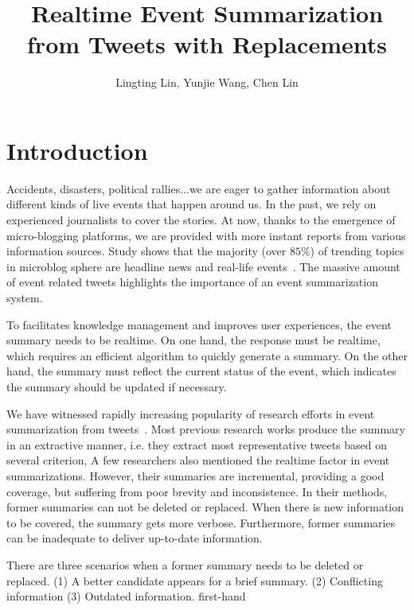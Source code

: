 \documentclass{article}
\author{Lingting Lin, Yunjie Wang, Chen Lin}
\title{Realtime Event Summarization from Tweets with Replacements}
\begin{document}
\maketitle
\section{Introduction}
Accidents, disasters, political rallies...we are eager to gather information about different kinds of live events that happen around us. In the past, we rely on experienced journalists to cover the stories. At now, thanks to the emergence of micro-blogging platforms, we are provided with more instant reports from various information sources. Study shows that the majority (over $85\%$) of trending topics in microblog sphere are headline news and real-life events~\cite{kwak2010twitter}. The massive amount of event related tweets highlights the importance of an event summarization system. 

To facilitates knowledge management and improves user experiences, the event summary needs to be realtime. On one hand, the response must be realtime, which requires an efficient algorithm to quickly generate a summary. On the other hand, the summary must reflect the current status of the event, which indicates the summary should be updated if necessary. 


We have witnessed rapidly increasing popularity of research efforts in event summarization from tweets~\cite{}.  Most previous research works produce the summary in an extractive manner, i.e. they extract most representative tweets based on several criterion,  A few researchers also mentioned the realtime factor in event summarizations. However, their summaries are incremental, providing a good coverage, but  suffering from  poor brevity and inconsistence. In their methods, former summaries can not be deleted or replaced. When there is new information to be covered, the summary gets more verbose. Furthermore, former summaries can be inadequate to deliver up-to-date information.


There are three scenarios when a former summary needs to be deleted or replaced. (1) A better candidate appears for a brief summary. (2) Conflicting information (3) Outdated information. first-hand
\end{document}
